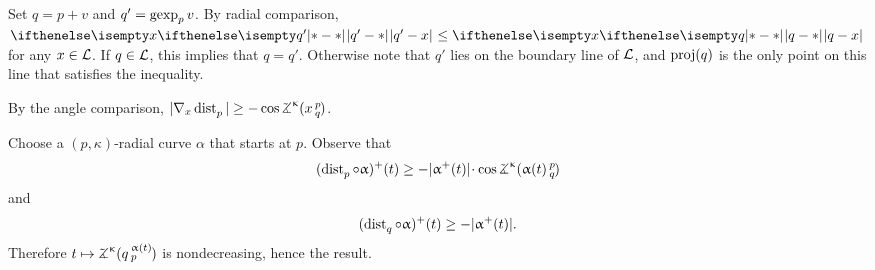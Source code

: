  Set $q=p+v$ and $q'=\mathop{\rm gexp}\nolimits_pv$. 
By radial comparison, $\dist{q'}{x}{}\le \dist{q}{x}{}$ for any $x\in \spc{L}$.
If $q\in \spc{L}$, this implies that $q=q'$.
Otherwise note that $q'$ lies on the boundary line of $\mathcal{L}$, and $\mathop{\rm proj}\nolimits(q)$ is the only point on this line that satisfies the inequality.

By the angle comparison,
$|\nabla_x\distfun p|\ge-\cos \angk\kappa xpq$.

Choose a $(p,\kappa)$-radial curve $\alpha$ that starts at $p$.
Observe that 
\[(\distfun p\circ \alpha)^+(t)\ge-|\alpha^+(t)|\cdot \cos \angk\kappa {\alpha(t)}p q\]
and
\[(\distfun q\circ\alpha)^+(t)\ge -|\alpha^+(t)|.\]
Therefore $t\mapsto\angk\kappa q{\alpha(t)}p$  is nondecreasing, hence the result.



